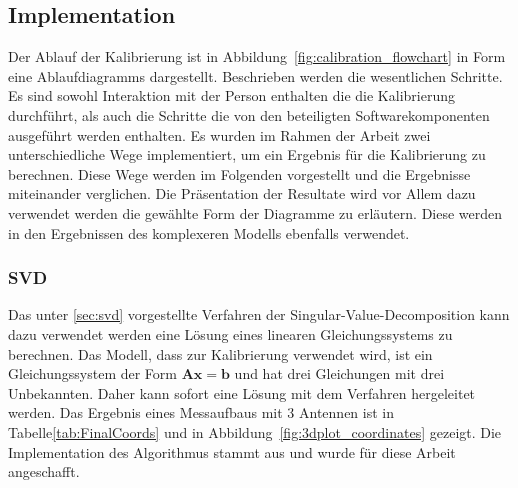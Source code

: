 \subsection{Implementation}
%
Der Ablauf der Kalibrierung ist in Abbildung~\ref{fig:calibration_flowchart} in Form eine Ablaufdiagramms dargestellt. Beschrieben werden die wesentlichen Schritte. Es sind sowohl Interaktion mit der Person enthalten die die Kalibrierung durchführt, als auch die Schritte die von den beteiligten Softwarekomponenten ausgeführt werden enthalten. Es wurden im Rahmen der Arbeit zwei unterschiedliche Wege implementiert, um ein Ergebnis für die Kalibrierung zu berechnen. Diese Wege werden im Folgenden vorgestellt und die Ergebnisse miteinander verglichen. Die Präsentation der Resultate wird vor Allem dazu verwendet werden die gewählte Form der Diagramme zu erläutern. Diese werden in den Ergebnissen des komplexeren Modells ebenfalls verwendet.
%
\subsubsection{SVD}
%
Das unter \ref{sec:svd} vorgestellte Verfahren der Singular-Value-Decomposition kann dazu verwendet werden eine Lösung eines linearen Gleichungssystems zu berechnen. Das Modell, dass zur Kalibrierung verwendet wird, ist ein Gleichungssystem der Form $\mathbf{A}\mathbf{x}=\mathbf{b}$ und hat drei Gleichungen mit drei Unbekannten. Daher kann sofort eine Lösung mit dem Verfahren hergeleitet werden. Das Ergebnis eines Messaufbaus mit 3 Antennen ist in Tabelle\ref{tab:FinalCoords} und in Abbildung~\ref{fig:3dplot_coordinates} gezeigt. Die Implementation des Algorithmus stammt aus \cite{press2007numerical} und wurde für diese Arbeit angeschafft.
%
